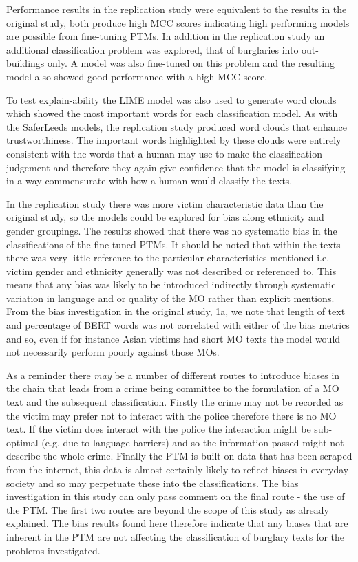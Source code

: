 Performance results in the replication study were equivalent to the results in the original study, both produce high MCC scores indicating high performing models are possible from fine-tuning PTMs. In addition in the replication study an additional classification problem was explored, that of burglaries into out-buildings only. A model was also fine-tuned on this problem and the resulting model also showed good performance with a high MCC score.

To test explain-ability the LIME model was also used to generate word clouds which showed the most important words for each classification model. As with the SaferLeeds models, the replication study produced word clouds that enhance trustworthiness. The important words highlighted by these clouds were entirely consistent with the words that a human may use to make the classification judgement and therefore they again give confidence that the model is classifying in a way commensurate with how a human would classify the texts.

In the replication study there was more victim characteristic data than the original study, so the models could be explored for bias along ethnicity and gender groupings. The results showed that there was no systematic bias in the classifications of the fine-tuned PTMs. It should be noted that within the texts there was very little reference to the particular characteristics mentioned i.e. victim gender and ethnicity generally was not described or referenced to. This means that any bias was likely to be introduced indirectly through systematic variation in language and or quality of the MO rather than explicit mentions. From the bias investigation in the original study, 1a,  we note that length of text and percentage of BERT words was not correlated with either of the bias metrics and so, even if for instance Asian victims had short MO texts the model would not necessarily perform poorly against those MOs. 

As a reminder there \emph{may} be a number of different routes to introduce biases in the chain that leads from a crime being committee to the formulation of a MO text and the subsequent classification. Firstly the crime may not be recorded as the victim may prefer not to interact with the police therefore there is no MO text. If the victim does interact with the police the interaction might be sub-optimal (e.g. due to language barriers) and so the information passed might not describe the whole crime. Finally the PTM is built on data that has been scraped from the internet, this data is almost certainly likely to reflect biases in everyday society and so may perpetuate these into the classifications. The bias investigation in this study can only pass comment on the final route - the use of the PTM. The first two routes are beyond the scope of this study as already explained. The bias results found here therefore indicate that any biases that are inherent in the PTM are not affecting the classification of burglary texts for the problems investigated. 

